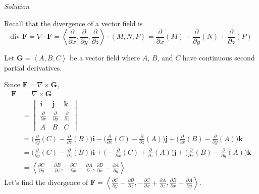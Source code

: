 \documentclass{article}
\newcommand{\lrp}[1]{\left( #1 \right)}
\newcommand{\lra}[1]{\left\langle #1 \right\rangle}
\renewcommand{\i}[0]{\mathbf{{i}}}
\renewcommand{\j}[0]{\mathbf{{j}}}
\renewcommand{\k}[0]{\mathbf{{k}}}
\newcommand{\F}[0]{\mathbf{F}}
\newcommand{\G}[0]{\mathbf{G}}
\newcommand{\Solution}{\textit{Solution}}
\begin{document}
\Solution

Recall that the divergence of a vector field is
\begin{equation*}
    \text{div }\F=\nabla \cdot \F=\lra{\frac{\partial }{\partial x},\frac{\partial }{\partial y},\frac{\partial }{\partial z}}\cdot \lra{M,N,P}=\frac{\partial}{\partial x}\lrp{M}+\frac{\partial}{\partial y}\lrp{N}+\frac{\partial}{\partial z}\lrp{P}
\end{equation*}

Let $\G=\lra{A,B,C}$ be a vector field where $A$, $B$, and $C$ have continuous second partial derivatives.

Since $\F=\nabla\times\G$,
\begin{align*}
   \F&=\nabla \times \G\\
   &=\begin{vmatrix}\i & \j & \k\\ \frac{\partial}{\partial x} & \frac{\partial}{\partial y}& \frac{\partial}{\partial z}\\ A & B & C\end{vmatrix}\\
    &=\Bigg(\frac{\partial }{\partial y}(C)-\frac{\partial }{\partial z}(B)\Bigg)\i-\Bigg(\frac{\partial}{\partial x}(C)-\frac{\partial}{\partial z}(A)\Bigg)\j+\Bigg(\frac{\partial}{\partial x}(B)-\frac{\partial}{\partial y}(A)\Bigg)\k\\
     &=\Bigg(\frac{\partial }{\partial y}(C)-\frac{\partial }{\partial z}(B)\Bigg)\i+\Bigg(-\frac{\partial}{\partial x}(C)+\frac{\partial}{\partial z}(A)\Bigg)\j+\Bigg(\frac{\partial}{\partial x}(B)-\frac{\partial}{\partial y}(A)\Bigg)\k\\
    &=\lra{\frac{\partial C}{\partial y}-\frac{\partial B}{\partial z}, -\frac{\partial C}{\partial x}+\frac{\partial A}{\partial z},\frac{\partial B}{\partial x}-\frac{\partial A}{\partial y}}
\end{align*}
Let's find the divergence of $\F = \displaystyle \lra{\frac{\partial C}{\partial y}-\frac{\partial B}{\partial z}, -\frac{\partial C}{\partial x}+\frac{\partial A}{\partial z},\frac{\partial B}{\partial x}-\frac{\partial A}{\partial y}}$.
\end{document}
